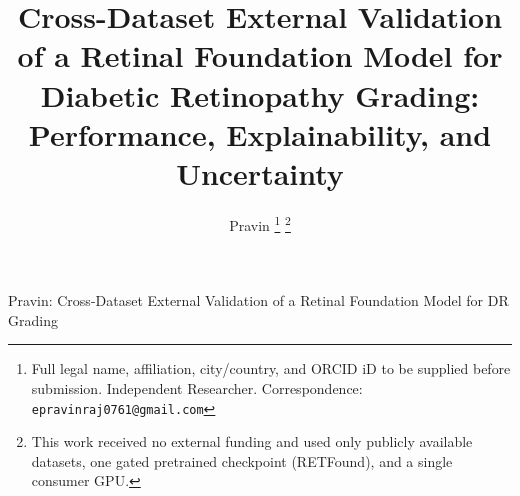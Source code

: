 \documentclass[journal]{IEEEtran}
\renewcommand{\_}{\origunderscore\allowbreak}
\begin{document}
\title{Cross-Dataset External Validation of a Retinal Foundation Model for
Diabetic Retinopathy Grading: Performance, Explainability, and Uncertainty}

\author{Pravin%
\thanks{Full legal name, affiliation, city/country, and ORCID iD to be supplied
before submission. Independent Researcher. Correspondence:
\texttt{epravinraj0761@gmail.com}}%
\thanks{This work received no external funding and used only publicly available
datasets, one gated pretrained checkpoint (RETFound), and a single consumer GPU.}}

%
{Pravin: Cross-Dataset External Validation of a Retinal Foundation Model for DR Grading}

\maketitle
\end{document}

